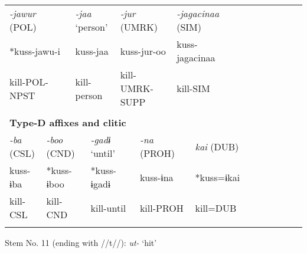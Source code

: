 \begin{tabularx}{\textwidth}{XXm{}XXXXXXXXXXXXXXXXXXXX}
\multicolumn{4}{X}{{ \textit{{}-jawur} (POL)}} & \multicolumn{3}{X}{{ \textit{{}-jaa} ‘person’}} & \multicolumn{5}{X}{{ \textit{{}-jur} (UMRK)}} & \multicolumn{4}{X}{{ \textit{{}-jagacinaa} (SIM)}} & \multicolumn{7}{X}{}\\
\multicolumn{4}{X}{{ *kuss-jawu-i}} & \multicolumn{3}{X}{kuss-jaa} & \multicolumn{5}{X}{{ kuss-jur-oo}} & \multicolumn{4}{X}{{ kuss-jagacinaa}} & \multicolumn{7}{X}{}\\
\multicolumn{4}{X}{kill-POL-NPST} & \multicolumn{3}{X}{kill-person} & \multicolumn{5}{X}{kill-UMRK-SUPP} & \multicolumn{4}{X}{kill-SIM} & \multicolumn{7}{X}{}\\
\multicolumn{23}{X}{}\\
\multicolumn{23}{X}{{\bfseries Type-D affixes and clitic}}\\
{ \textit{{}-ba} (CSL)} & \multicolumn{4}{X}{{ \textit{{}-boo} (CND)}} & \multicolumn{4}{X}{{ \textit{{}-gadɨ} ‘until’}} & \multicolumn{4}{X}{{ \textit{{}-na} (PROH)}} & \multicolumn{4}{X}{{ \textit{kai} (DUB)}} & \multicolumn{6}{X}{}\\
{ kuss-ɨba} & \multicolumn{4}{X}{{ *kuss-ɨboo}} & \multicolumn{4}{X}{{ *kuss-ɨgadɨ}} & \multicolumn{4}{X}{{ kuss-ɨna}} & \multicolumn{4}{X}{{ *kuss=ɨkai}} & \multicolumn{6}{X}{}\\
kill-CSL & \multicolumn{4}{X}{kill-CND} & \multicolumn{4}{X}{kill-until} & \multicolumn{4}{X}{kill-PROH} & \multicolumn{4}{X}{kill=DUB} & \multicolumn{6}{X}{}\\
\lspbottomrule
\end{tabularx}
Stem No. 11 (ending with //t//): \textit{ut-} ‘hit’

\tablefirsthead{}


